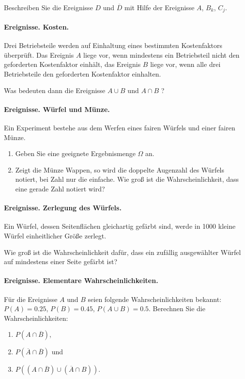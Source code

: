 Beschreiben Sie die Ereignisse $D$ und $\overline{D}$ mit Hilfe der Ereignisse
$A$, $B_k$, $C_j$.


\paragraph{Ereignisse. Kosten.}
Drei Betriebsteile werden auf Einhaltung eines bestimmten
Kostenfaktors überprüft. Das Ereignis $A$ liege vor, wenn mindestens ein
Betriebsteil nicht den geforderten Kostenfaktor einhält, das Ereignis $B$ liege
vor, wenn alle drei Betriebsteile den geforderten Kostenfaktor einhalten.

Was bedeuten dann die Ereignisse $A\cup B$ und $A\cap B$ ?


\paragraph{Ereignisse. Würfel und Münze.}
Ein Experiment bestehe aus dem Werfen eines fairen Würfels und einer fairen Münze.
\begin{enumerate}
    \item Geben Sie eine geeignete Ergebnismenge $\Omega$ an.
    \item Zeigt die Münze Wappen, so wird die doppelte Augenzahl des Würfels
        notiert, bei Zahl nur die einfache. Wie groß ist die
        Wahrscheinlichkeit, dass eine gerade Zahl notiert wird?
\end{enumerate}


\paragraph{Ereignisse. Zerlegung des Würfels.}
Ein Würfel, dessen Seitenflächen gleichartig gefärbt sind, werde in 1000
kleine Würfel einheitlicher Größe zerlegt.

Wie groß ist die Wahrscheinlichkeit dafür, dass ein zufällig ausgewählter
Würfel auf mindestens einer Seite gefärbt ist?


\paragraph{Ereignisse. Elementare Wahrscheinlichkeiten.}
Für die Ereignisse $A$ und $B$ seien folgende Wahrscheinlichkeiten bekannt:
$P(A)=0.25$, $P(B)=0.45$, $P(A\cup B)=0.5$. Berechnen Sie die
Wahrscheinlichkeiten:
\begin{enumerate}
    \item $P(A\cap\overline{B})$,
    \item $P(\overline{A}\cap\overline{B})$ und
    \item $P\left((A\cap\overline{B})\cup(\overline{A}\cap B)\right)$.
\end{enumerate}



